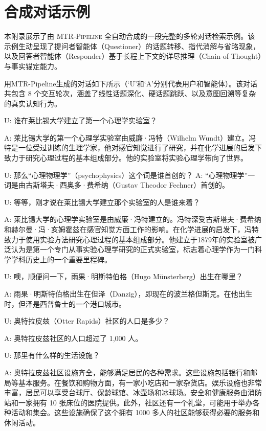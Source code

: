 \section{合成对话示例}
\label{app:synthetic_dialogue}

本附录展示了由 \textsc{MTR-Pipeline} 全自动合成的一段完整的多轮对话检索示例。该示例生动呈现了提问者智能体（Questioner）的话题转移、指代消解与省略现象，以及回答者智能体（Responder）基于长程上下文的详尽推理（Chain-of-Thought）与事实锚定能力。

用MTR-Pipeline生成的对话如下所示（‘U’和‘A’分别代表用户和智能体）。该对话共包含 8 个交互轮次，涵盖了线性话题深化、硬话题跳跃、以及意图回溯等复杂的真实认知行为。

U: 谁在莱比锡大学建立了第一个心理学实验室？

A: 莱比锡大学的第一个心理学实验室由威廉·冯特（Wilhelm Wundt）建立。冯特是一位受过训练的生理学家，他对感官知觉进行了研究，并在化学进展的启发下致力于研究心理过程的基本组成部分。他的实验室将实验心理学带向了世界。

U: 那么“心理物理学”（psychophysics）这个词是谁首创的？
A: “心理物理学”一词是由古斯塔夫·西奥多·费希纳（Gustav Theodor Fechner）首创的。

U: 等等，刚才说在莱比锡大学建立那个实验室的人是谁来着？

A: 莱比锡大学的心理学实验室是由威廉·冯特建立的。冯特深受古斯塔夫·费希纳和赫尔曼·冯·亥姆霍兹在感官知觉方面工作的影响。在化学进展的启发下，冯特致力于使用实验方法研究心理过程的基本组成部分。他建立于1879年的实验室被广泛认为是第一个专门从事实验心理学研究的正式实验室，标志着心理学作为一门科学学科历史上的一个重要里程碑。

U: 噢，顺便问一下，雨果·明斯特伯格（Hugo Münsterberg）出生在哪里？

A: 雨果·明斯特伯格出生在但泽（Danzig），即现在的波兰格但斯克。在他出生时，但泽是西普鲁士的一个港口城市。

U: 奥特拉皮兹（Otter Rapids）社区的人口是多少？

A: 奥特拉皮兹社区的人口超过了 1,000 人。

U: 那里有什么样的生活设施？

A: 奥特拉皮兹社区设施齐全，能够满足居民的各种需求。这些设施包括银行和邮局等基本服务。在餐饮和购物方面，有一家小吃店和一家杂货店。娱乐设施也非常丰富，居民可以享受台球厅、保龄球馆、冰壶场和冰球场。安全和健康服务由消防站和一家拥有 10 张床位的医院提供。此外，社区还有一个礼堂，可能用于举办各种活动和集会。这些设施确保了这个拥有 1000 多人的社区能够获得必要的服务和休闲活动。


